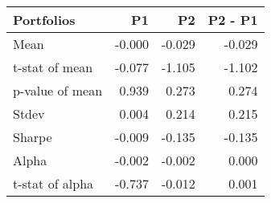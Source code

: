\begin{tabular}{lrrr}
\toprule
Portfolios & P1 & P2 & P2 - P1 \\
\midrule
Mean & -0.000 & -0.029 & -0.029 \\
t-stat of mean & -0.077 & -1.105 & -1.102 \\
p-value of mean & 0.939 & 0.273 & 0.274 \\
Stdev & 0.004 & 0.214 & 0.215 \\
Sharpe & -0.009 & -0.135 & -0.135 \\
Alpha & -0.002 & -0.002 & 0.000 \\
t-stat of alpha & -0.737 & -0.012 & 0.001 \\
\bottomrule
\end{tabular}

